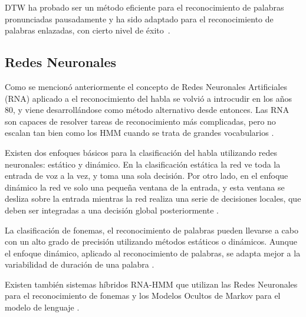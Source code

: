 DTW ha probado ser un m\'etodo eficiente para el reconocimiento de palabras pronunciadas pausadamente \cite{MyersALevel1981} y ha sido
adaptado para el reconocimiento de palabras enlazadas, con cierto nivel de 
\mbox{\'exito \cite{MyersALevel1981, SakoeTwoLevel1979, RabinerApplication1980}}.

\subsection{Redes Neuronales}
\label{sec:otrosModelosANN}

Como se mencion\'o anteriormente el concepto de Redes Neuronales Artificiales (RNA) aplicado a el reconocimiento
del habla se volvi\'o a introcudir en los a\~nos 80, 
y viene desarroll\'andose como m\'etodo alternativo desde entonces. Las RNA son capaces de resolver tareas de reconocimiento
m\'as complicadas, pero no escalan tan bien como los HMM cuando se trata de grandes vocabularios \cite{VimalaReview2012}.

Existen dos enfoques b\'asicos para la clasificaci\'on del habla utilizando redes neuronales: est\'atico y din\'amico. En la
clasificaci\'on est\'atica la red ve toda la entrada de voz a la vez, y toma una sola decisi\'on. Por otro lado, en el enfoque
din\'amico la red ve solo una peque\~na ventana de la entrada, y esta ventana se desliza sobre la entrada mientras la red
realiza una serie de decisiones locales, que deben ser integradas a una decisi\'on global posteriormente \cite{TebelskisSpeech1995}.

La clasificaci\'on de fonemas, el reconocimiento de palabras pueden llevarse a cabo con un alto
grado de precisi\'on utilizando m\'etodos est\'aticos o din\'amicos. Aunque el enfoque din\'amico, aplicado al reconocimiento de
palabras, se adapta mejor a la variabilidad de duraci\'on de una palabra \cite{TebelskisSpeech1995}.

Existen tambi\'en sistemas h\'ibridos RNA-HMM que utilizan las Redes Neuronales para el reconocimiento de fonemas y los Modelos
Ocultos de Markov para el modelo de lenguaje \cite{VimalaReview2012}.
